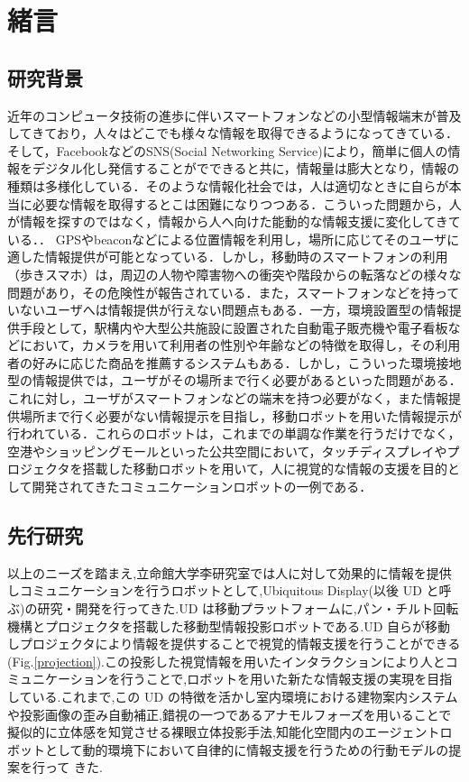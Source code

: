 \documentclass[12pt]{sonota/aislab}
\begin{document}
\egroup

\mainmatter

\chapter{緒言}\label{chap:introduction}

\section{研究背景}
近年のコンピュータ技術の進歩に伴いスマートフォンなどの小型情報端末が普及してきており，人々はどこでも様々な情報を取得できるようになってきている．そして，FacebookなどのSNS(Social Networking Service)により，簡単に個人の情報をデジタル化し発信することがでできると共に，情報量は膨大となり，情報の種類は多様化している．そのような情報化社会では，人は適切なときに自らが本当に必要な情報を取得するとこは困難になりつつある．こういった問題から，人が情報を探すのではなく，情報から人へ向けた能動的な情報支援に変化してきている．．
GPSやbeaconなどによる位置情報を利用し，場所に応じてそのユーザに適した情報提供が可能となっている．しかし，移動時のスマートフォンの利用（歩きスマホ）は，周辺の人物や障害物への衝突や階段からの転落などの様々な問題があり，その危険性が報告されている\cite{aruki}．また，スマートフォンなどを持っていないユーザへは情報提供が行えない問題点もある．一方，環境設置型の情報提供手段として，駅構内や大型公共施設に設置された自動電子販売機や電子看板などにおいて，カメラを用いて利用者の性別や年齢などの特徴を取得し，その利用者の好みに応じた商品を推薦するシステムもある．しかし，こういった環境接地型の情報提供では，ユーザがその場所まで行く必要があるといった問題がある．
\\ \indent
これに対し，ユーザがスマートフォンなどの端末を持つ必要がなく，また情報提供場所まで行く必要がない情報提示を目指し，移動ロボットを用いた情報提示が行われている\cite{spencr}\cite{UD}．これらのロボットは，これまでの単調な作業を行うだけでなく，空港やショッピングモールといった公共空間において，タッチディスプレイやプロジェクタを搭載した移動ロボットを用いて，人に視覚的な情報の支援を目的として開発されてきたコミュニケーションロボットの一例である．
\section{先行研究}
以上のニーズを踏まえ,立命館大学李研究室では人に対して効果的に情報を提供しコミュニケーションを行うロボットとして,Ubiquitous Display(以後 UD と呼ぶ)の研究・開発を行ってきた\cite{UD1}\cite{UD2}\cite{UD3}\cite{UD4}\cite{UD5}.UD は移動プラットフォームに,パン・チルト回転機構とプロジェクタを搭載した移動型情報投影ロボットである.UD 自らが移動しプロジェクタにより情報を提供することで視覚的情報支援を行うことができる(Fig.\ref{projection}).この投影した視覚情報を用いたインタラクションにより人とコミュニケーションを行うことで,ロボットを用いた新たな情報支援の実現を目指している.これまで,この UD の特徴を活かし室内環境における建物案内システムや投影画像の歪み自動補正,錯視の一つであるアナモルフォーズを用いることで擬似的に立体感を知覚させる裸眼立体投影手法\cite{UD2},知能化空間内のエージェントロボットとして動的環境下において自律的に情報支援を行うための行動モデルの提案\cite{UD5}を行って
きた.
\end{document}
